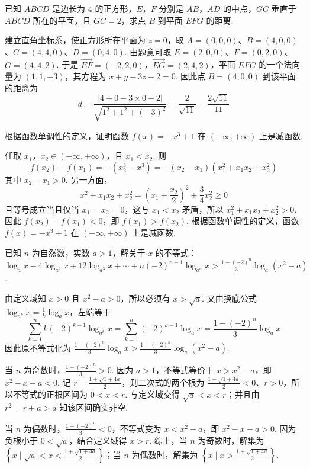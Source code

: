 \documentclass[UTF8,a4paper,oneside,11pt]{ctexbook}
\begin{document}
\begin{problem}
已知 \(ABCD\) 是边长为 \(4\) 的正方形，\(E\)，\(F\) 分别是 \(AB\)，\(AD\) 的中点，\(GC\) 垂直于 \(ABCD\) 所在的平面，且 \(GC=2\)，求点 \(B\) 到平面 \(EFG\) 的距离.

\begin{solution}
建立直角坐标系，使正方形所在平面为 \(z=0\)，取 \(A=(0,0,0)\)、\(B=(4,0,0)\)、\(C=(4,4,0)\)、\(D=(0,4,0)\). 由题意可取 \(E=(2,0,0)\)、\(F=(0,2,0)\)、\(G=(4,4,2)\). 于是 \(\overrightarrow{EF}=(-2,2,0)\)，\(\overrightarrow{EG}=(2,4,2)\)，平面 \(EFG\) 的一个法向量为 \((1,1,-3)\)，其方程为 \(x+y-3z-2=0\). 因此点 \(B=(4,0,0)\) 到该平面的距离为
\[
d=\frac{\lvert4+0-3\times0-2\rvert}{\sqrt{1^2+1^2+(-3)^2}}=\frac{2}{\sqrt{11}}=\frac{2\sqrt{11}}{11}
\]
\end{solution}
\end{problem}

\begin{problem}
根据函数单调性的定义，证明函数 \(f(x)=-x^3+1\) 在 \(\left(-\infty,+\infty\right)\) 上是减函数.

\begin{solution}
任取 \(x_1\)，\(x_2\in\left(-\infty,+\infty\right)\)，且 \(x_1<x_2\). 则
\[
f(x_2)-f(x_1)=-(x_2^3-x_1^3)=-(x_2-x_1)(x_1^2+x_1x_2+x_2^2)
\]
其中 \(x_2-x_1>0\). 另一方面，
\[
x_1^2+x_1x_2+x_2^2=\left(x_1+\frac{x_2}{2}\right)^2+\frac34x_2^2\geqslant0
\]
且等号成立当且仅当 \(x_1=x_2=0\)，这与 \(x_1<x_2\) 矛盾，所以 \(x_1^2+x_1x_2+x_2^2>0\). 因此 \(f(x_2)-f(x_1)<0\)，即 \(f(x_1)>f(x_2)\). 根据函数单调性的定义，函数 \(f(x)=-x^3+1\) 在 \(\left(-\infty,+\infty\right)\) 上是减函数.
\end{solution}
\end{problem}

\begin{problem}
已知 \(n\) 为自然数，实数 \(a>1\)，解关于 \(x\) 的不等式：\(\log_a x-4\log_{a^2} x+12\log_{a^3} x+\cdots+n(-2)^{n-1}\log_{a^n} x>\frac{1-(-2)^n}{3}\log_a\left(x^2-a\right)\).

\begin{solution}
由定义域知 \(x>0\) 且 \(x^2-a>0\)，所以必须有 \(x>\sqrt a\). 又由换底公式 \(\log_{a^k}x=\frac1k\log_a x\)，左端等于
\[
\sum_{k=1}^{n}k(-2)^{k-1}\log_{a^k}x=\sum_{k=1}^{n}(-2)^{k-1}\log_a x=\frac{1-(-2)^n}{3}\log_a x
\]
因此原不等式化为 \(\frac{1-(-2)^n}{3}\log_a x>\frac{1-(-2)^n}{3}\log_a\left(x^2-a\right)\).

当 \(n\) 为奇数时，\(\frac{1-(-2)^n}{3}>0\). 因为 \(a>1\)，不等式等价于 \(x>x^2-a\)，即 \(x^2-x-a<0\). 记 \(r=\frac{1+\sqrt{1+4a}}{2}\)，则二次式的两个根为 \(\frac{1-\sqrt{1+4a}}{2}<0\)、\(r>0\)，所以不等式的正根区间为 \(0<x<r\). 与定义域交得 \(\sqrt a<x<r\)；并且由 \(r^2=r+a>a\) 知该区间确实非空.

当 \(n\) 为偶数时，\(\frac{1-(-2)^n}{3}<0\)，不等式变为 \(x<x^2-a\)，即 \(x^2-x-a>0\). 因为负根小于 \(0<\sqrt a\)，结合定义域得 \(x>r\). 综上，当 \(n\) 为奇数时，解集为 \(\left\{x\mid\sqrt a<x<\frac{1+\sqrt{1+4a}}{2}\right\}\)；当 \(n\) 为偶数时，解集为 \(\left\{x\mid x>\frac{1+\sqrt{1+4a}}{2}\right\}\).
\end{solution}
\end{problem}
\end{document}
